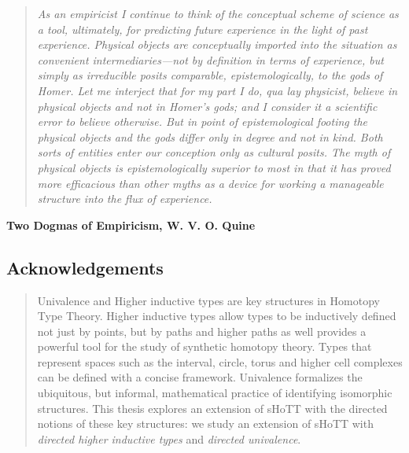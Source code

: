 \documentclass{article}
\theoremstyle{named}
\theoremstyle{remark}
\theoremstyle{definition}
\begin{document}
\listoftodos
{}

\clearpage

\thispagestyle{empty}
\null\vfill
\begin{quote}
    \itshape
    As an empiricist I continue to think of the conceptual scheme of science as a tool, ultimately, for predicting future experience in the light of past experience. Physical objects are conceptually imported into the situation as convenient intermediaries—not by definition in terms of experience, but simply as irreducible posits comparable, epistemologically, to the gods of Homer. Let me interject that for my part I do, \textit{qua} lay physicist, believe in physical objects and not in Homer’s gods; and I consider it a scientific error to believe otherwise. But in point of epistemological footing the physical objects and the gods differ only in degree and not in kind. Both sorts of entities enter our conception only as cultural posits. The myth of physical objects is epistemologically superior to most in that it has proved more efficacious than other myths as a device for working a manageable structure into the flux of experience.
    \end{quote}
    
    \begin{flushright}
    \textbf{Two Dogmas of Empiricism, W. V. O. Quine}
    \end{flushright}

\vfill\vfill

\clearpage

\subsection*{\centering Acknowledgements}
\newpage
{}

\newpage
\begin{abstract}
    Univalence and Higher inductive types are key structures in Homotopy Type Theory. Higher inductive types allow types to be inductively
     defined not just by points, but by paths and higher paths as well provides a powerful tool for the study of synthetic homotopy theory. 
     Types that represent spaces such as the interval, circle, torus and higher cell complexes can be defined with a concise framework. 
     Univalence formalizes the ubiquitous, but informal, mathematical practice of identifying isomorphic structures. This thesis explores
     an extension of sHoTT with the directed notions of these key structures: we study an extension of sHoTT with \textit{directed higher inductive types}
     and \textit{directed univalence}.
    \end{abstract}
\newpage
\tableofcontents
\end{document}
